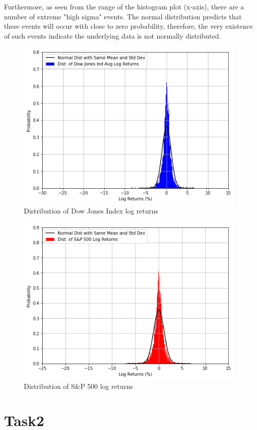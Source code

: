 \documentclass[a4paper]{article}
\begin{document}
Furthermore, as seen from the range of the histogram plot (x-axis), there are a number of extreme "high sigma" events. The normal distribution predicts that these events will occur with close to zero probability, therefore, the very existence of such events indicate the underlying data is not normally distributed. 

\begin{figure}[h!]
	\centering
	\includegraphics[width=0.8\linewidth]{DJInorm.png}
	\caption{Distribution of Dow Jones Index log returns}
\end{figure}
\begin{figure}[h!]
	\centering
	\includegraphics[width=0.8\linewidth]{GSPCnorm.png}
	\caption{Distribution of S\&P 500 log returns}
\end{figure}

\newpage
\section{Task2}
\label{sec:introduction}
\end{document}
